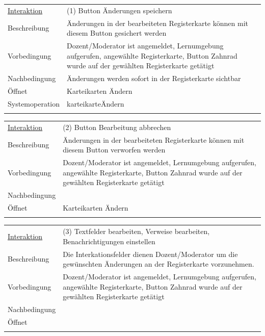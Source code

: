 \documentclass[12pt,a4paper]{article}
\begin{document}
{\begin{tabular}{l p{12cm}}
\underline{Interaktion} & (1) Button Änderungen speichern \\ 
Beschreibung   	 		& Änderungen in der bearbeiteten Registerkarte können mit diesem Button gesichert werden\\
Vorbedingung	 		& Dozent/Moderator ist angemeldet, Lernumgebung aufgerufen, angewählte Registerkarte, Button Zahnrad wurde auf der gewählten Registerkarte getätigt\\
Nachbedingung	 		& Änderungen werden sofort in der Registerkarte sichtbar\\
Öffnet			 		& \glqq Karteikarten Ändern\grqq \\
Systemoperation & karteikarteÄndern\\\\
\end{tabular}

\begin{tabular}{l p{12cm}}
\underline{Interaktion} & (2)  Button Bearbeitung  abbrechen  \\ 
Beschreibung   	 		& Änderungen in der bearbeiteten Registerkarte können mit diesem Button verworfen werden\\
Vorbedingung	 		& Dozent/Moderator ist angemeldet, Lernumgebung aufgerufen, angewählte Registerkarte, Button Zahnrad wurde auf der gewählten Registerkarte getätigt\\
Nachbedingung	 		& \\
Öffnet			 		& \glqq  Karteikarten Ändern\grqq \\\\
\end{tabular}

\begin{tabular}{l p{12cm}}
\underline{Interaktion} & (3) Textfelder bearbeiten, Verweise bearbeiten, Benachrichtigungen einstellen  \\ 
Beschreibung   	 		& Die Interkationsfelder dienen Dozent/Moderator um die gewünschten Änderungen an der Registerkarte vorzunehmen. \\
Vorbedingung	 		& Dozent/Moderator ist angemeldet, Lernumgebung aufgerufen, angewählte Registerkarte, Button Zahnrad wurde auf der gewählten Registerkarte getätigt\\
Nachbedingung	 		& \\
Öffnet			 		&  \\\\
\end{tabular}

\begin{figure}[H]
	\centering

\end{figure}}
\end{document}
